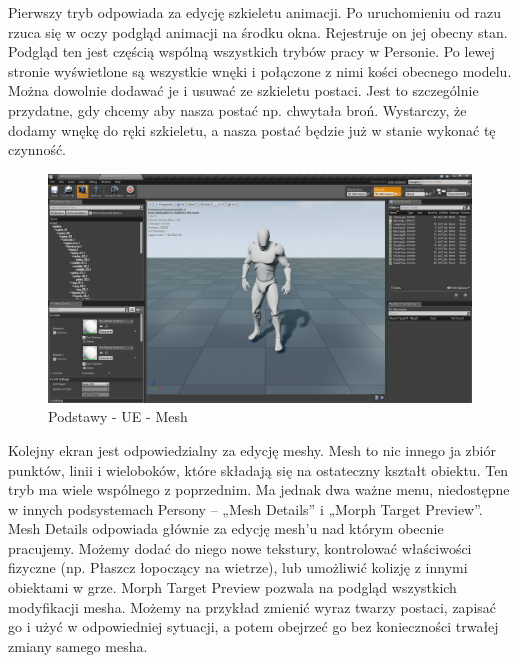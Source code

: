 \documentclass[12pt]{xmgr}
\begin{document}
Pierwszy tryb odpowiada za edycję szkieletu animacji. Po uruchomieniu od razu rzuca się w oczy podgląd animacji na środku okna. Rejestruje on jej obecny stan. Podgląd ten jest częścią wspólną wszystkich trybów pracy w Personie. Po lewej stronie wyświetlone są wszystkie wnęki i połączone z nimi kości obecnego modelu. Można dowolnie dodawać je i usuwać ze szkieletu postaci. Jest to szczególnie przydatne, gdy chcemy aby nasza postać np. chwytała broń. Wystarczy, że dodamy wnękę do ręki szkieletu, a nasza postać będzie już w stanie wykonać tę czynność.

\begin{figure}[!htb]
    \begin{center}
    \includegraphics[scale=0.25]{Screeny/Mesh}
    \end{center}
    \caption{Podstawy - UE - Mesh}
\end{figure}

Kolejny ekran jest odpowiedzialny za edycję meshy. Mesh to nic innego ja zbiór punktów, linii i wieloboków, które składają się na ostateczny kształt obiektu.
Ten tryb ma wiele wspólnego z poprzednim. Ma jednak dwa ważne menu, niedostępne w innych podsystemach Persony – „Mesh Details” i „Morph Target Preview”.
Mesh Details odpowiada głównie za edycję mesh’u nad którym obecnie pracujemy. Możemy dodać do niego nowe tekstury, kontrolować właściwości fizyczne (np. Płaszcz łopoczący na wietrze), lub umożliwić kolizję z innymi obiektami w grze.
Morph Target Preview pozwala na podgląd wszystkich modyfikacji mesha. Możemy na przykład zmienić wyraz twarzy postaci, zapisać go i użyć w odpowiedniej sytuacji, a potem obejrzeć go bez konieczności trwałej zmiany samego mesha.
\end{document}
